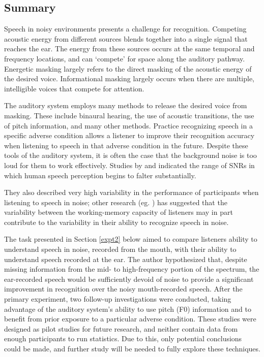 \subsection{Summary}

Speech in noisy environments presents a challenge for recognition.  Competing acoustic energy from different sources blends together into a single signal that reaches the ear.  The energy from these sources occurs at the same temporal and frequency locations, and can `compete' for space along the auditory pathway.  Energetic masking largely refers to the direct masking of the acoustic energy of the desired voice.  Informational masking largely occurs when there are multiple, intelligible voices that compete for attention.

The auditory system employs many methods to release the desired voice from masking.  These include binaural hearing, the use of acoustic transitions, the use of pitch information, and many other methods.  Practice recognizing speech in a specific adverse condition allows a listener to improve their recognition accuracy when listening to speech in that adverse condition in the future.  Despite these tools of the auditory system, it is often the case that the background noise is too loud for them to work effectively.  Studies by \cite{ding:13} and \cite{gilbert:13} indicated the range of SNRs in which human speech perception begins to falter substantially.

They also described very high variability in the performance of participants when listening to speech in noise; other research (eg. \cite{tamati:13}) has suggested that the variability between the working-memory capacity of listeners may in part contribute to the variability in their ability to recognize speech in noise.

The task presented in Section \ref{expt2} below aimed to compare listeners ability to understand speech in noise, recorded from the mouth, with their ability to understand speech recorded at the ear.  The author hypothesized that, despite missing information from the mid- to high-frequency portion of the spectrum, the ear-recorded speech would be sufficiently devoid of noise to provide a significant improvement in recognition over the noisy mouth-recorded speech.  After the primary experiment, two follow-up investigations were conducted, taking advantage of the auditory system's ability to use pitch (F0) information and to benefit from prior exposure to a particular adverse condition.  These studies were designed as pilot studies for future research, and neither contain data from enough participants to run statistics.  Due to this, only potential conclusions could be made, and further study will be needed to fully explore these techniques. 


